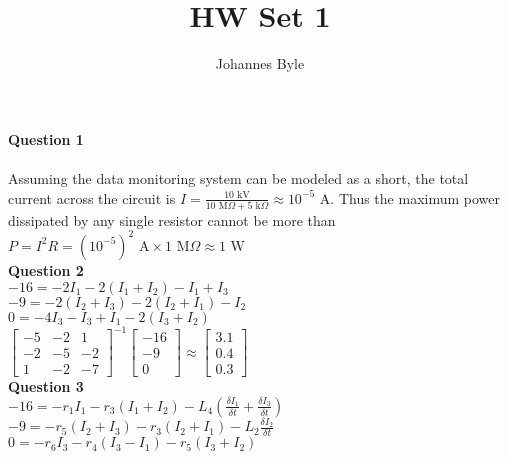 \documentclass[12pt]{article}
\author{Johannes Byle}
\title{HW Set 1}
\begin{document}
    \maketitle
    \noindent
    \textbf{Question 1}\\
    \\
    Assuming the data monitoring system can be modeled as a short, the total current across the circuit is
    $I=\frac{10\text{ kV}}{10\text{ M}\Omega+5\text{ k}\Omega}\approx10^{-5}\text{ A}$.
    Thus the maximum power dissipated by any single resistor cannot be more than
    $P=I^{2}R=(10^{-5})^2\text{ A}\times1\text{ M}\Omega\approx1\text{ W}$\\

    \noindent
    \textbf{Question 2}\\
    $-16=-2I_{1} - 2(I_{1}+I_{2}) - I_{1}+I_{3}$\\
    $-9=-2(I_{2}+I_{3}) - 2(I_{2}+I_{1}) - I_{2}$\\
    $0=-4I_{3}-I_{3}+I_{1}-2(I_{3}+I_{2})$\\
    $\begin{bmatrix}
         -5 & -2 & 1\\
         -2 & -5 & -2\\
         1 & -2 & -7
    \end{bmatrix}^{-1}
    \begin{bmatrix}
        -16\\
        -9\\
        0
    \end{bmatrix}\approx
    \begin{bmatrix}
        3.1\\
        0.4\\
        0.3
    \end{bmatrix}$\\

    \noindent
    \textbf{Question 3}\\
    $-16=-r_1I_{1} - r_3(I_{1}+I_{2}) - L_4(\frac{\delta I_{1}}{\delta t}+\frac{\delta I_{3}}{\delta t})$\\
    $-9=-r_5(I_{2}+I_{3}) - r_3(I_{2}+I_{1}) - L_2\frac{\delta I_{2}}{\delta t}$\\
    $0=-r_6I_{3}-r_4(I_{3}-I_{1})-r_5(I_{3}+I_{2})$\\
\end{document}
